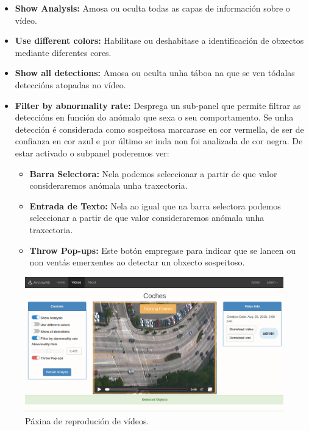 \documentclass[11pt, a4paper, twoside, titlepage]{book}
\begin{document}
    \begin{itemize}
     \item \textbf{Show Analysis:} Amosa ou oculta todas as capas de información sobre o vídeo.
     \item \textbf{Use different colors:} Habilitase ou deshabitase a identificación de obxectos
        mediante diferentes cores.
     \item \textbf{Show all detections:} Amosa ou oculta unha táboa na que se ven tódalas deteccións
        atopadas no vídeo.
     \item \textbf{Filter by abnormality rate:} Desprega un sub-panel que permite filtrar as 
        deteccións en función do anómalo que sexa o seu comportamento. Se unha detección é 
        considerada como sospeitosa marcarase en cor vermella, de ser de confianza en cor azul e por
        último se inda non foi analizada de cor negra. De estar activado o subpanel
        poderemos ver:
        \begin{itemize}
         \item \textbf{Barra Selectora:} Nela podemos seleccionar a partir de que valor 
            consideraremos anómala unha traxectoria.
         \item \textbf{Entrada de Texto:} Nela ao igual que na barra selectora podemos seleccionar 
            a partir de que valor consideraremos anómala unha traxectoria.
         \item \textbf{Throw Pop-ups:} Este botón empregase para indicar que se lancen ou non ventás
            emerxentes ao detectar un obxecto sospeitoso.
        \end{itemize}
    \end{itemize}

        \begin{figure}[htp]
        \begin{center}
            \includegraphics[scale=0.4]{figures/paxDetails.png}
            \caption{Páxina de reprodución de vídeos.}
        \label{fig:paxDetails}
        \end{center}
        \end{figure}
        
\end{document}

